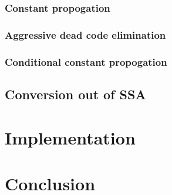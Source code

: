 \documentclass[a4paper,10pt]{report}
\begin{document}
\subsection{Constant propogation}


\subsection{Aggressive dead code elimination}


\subsection{Conditional constant propogation}


\section{Conversion out of SSA}


\chapter{Implementation}


\chapter{Conclusion}
\end{document}
